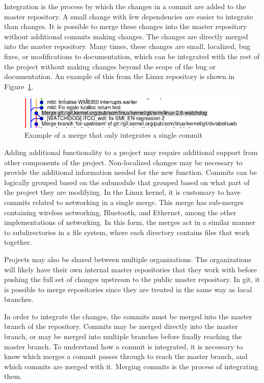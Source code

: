 Integration is the process by which the changes in a commit are added to
the master repository.
A small change with few dependencies are easier to integrate than
changes.
It is possible to merge these changes into the master repository
without additional commits making changes.
The changes are directly merged into the master repository.
Many times, these changes are small, localized, bug fixes, or modifications to
documentation, which can be integrated with the rest of the project
without making changes beyond the scope of the bug or documentation.
An example of this from the Linux repository is shown in
Figure~\ref{fig:single_commit_merge}.

\begin{figure}[htpb]
  \centering
  \includegraphics[width=0.8\linewidth]{Figures/background/single_commit.png}
  \caption{Example of a merge that only integrates a single commit}
  \label{fig:single_commit_merge}
\end{figure}


Adding additional functionality to a project may require additional
support from other components of the project.
Non-localized changes may be necessary to provide the additional
information needed for the new function.
Commits can be logically grouped based on the submodule that grouped
based on what part of the project they are modifying.
In the Linux kernel, it is customary to have commits related to
networking in a single merge.
This merge has sub-merges containing wireless networking, Bluetooth,
and Ethernet, among the other implementations of networking.
In this form, the merges act in a similar manner to subdirectories in a
file system, where each directory contains files that work together.

Projects may also be shared between multiple organizations.
The organizations will likely have their own internal master
repositories that they work with before pushing the full set of
changes upstream to the public master repository.
In git, it is possible to merge repositories since they are treated in
the same way as local branches.

In order to integrate the changes, the commits must be merged into the
master branch of the repository.
Commits may be merged directly into the master branch, or may be merged
into multiple branches before finally reaching the master branch.
To understand how a commit is integrated, it is necessary to know which
merges a commit passes through to reach the master branch, and which
commits are merged with it.
Merging commits is the process of integrating them.

